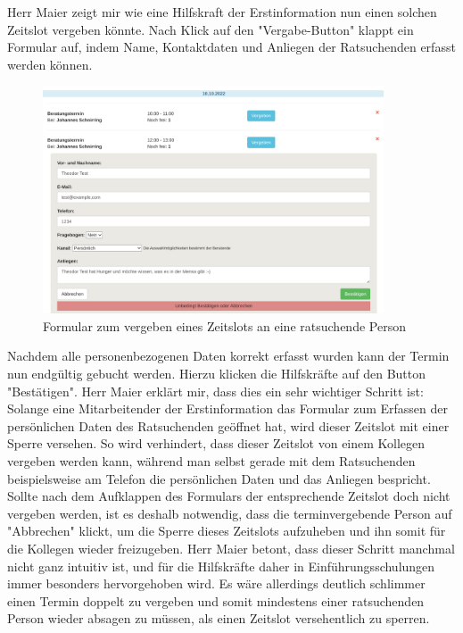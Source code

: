 \documentclass[12pt]{article}
\newcommand{\ipName}{Herr Maier }
\begin{document}
\ipName zeigt mir wie eine Hilfskraft der Erstinformation nun einen solchen
Zeitslot vergeben könnte. Nach Klick auf den "Vergabe-Button" klappt ein
Formular auf, indem Name, Kontaktdaten und Anliegen der Ratsuchenden erfasst
werden können.

\begin{figure}[h]
    \caption{Formular zum vergeben eines Zeitslots an eine ratsuchende Person}
    \centering
    \includegraphics[width=0.9\textwidth]{screen_old_clientdata.png}
\end{figure}

Nachdem alle personenbezogenen Daten korrekt erfasst wurden kann der Termin nun
endgültig gebucht werden. Hierzu klicken die Hilfskräfte auf den Button
"Bestätigen". \ipName erklärt mir, dass dies ein sehr wichtiger Schritt ist:
Solange eine Mitarbeitender der Erstinformation das Formular zum Erfassen der
persönlichen Daten des Ratsuchenden geöffnet hat, wird dieser Zeitslot mit
einer Sperre versehen. So wird verhindert, dass dieser Zeitslot von einem
Kollegen vergeben werden kann, während man selbst gerade mit dem Ratsuchenden
beispielsweise am Telefon die persönlichen Daten und das Anliegen bespricht.
Sollte nach dem Aufklappen des Formulars der entsprechende Zeitslot doch nicht
vergeben werden, ist es deshalb notwendig, dass die terminvergebende Person auf
"Abbrechen" klickt, um die Sperre dieses Zeitslots aufzuheben und ihn somit für
die Kollegen wieder freizugeben. \ipName betont, dass dieser Schritt manchmal
nicht ganz intuitiv ist, und für die Hilfskräfte daher in Einführungsschulungen
immer besonders hervorgehoben wird. Es wäre allerdings deutlich schlimmer einen
Termin doppelt zu vergeben und somit mindestens einer ratsuchenden Person
wieder absagen zu müssen, als einen Zeitslot versehentlich zu sperren.
\end{document}
